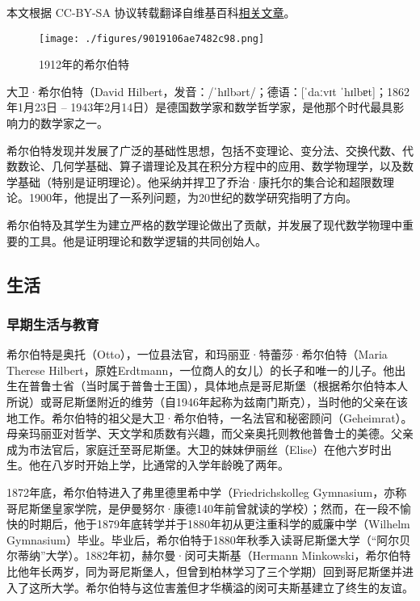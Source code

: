 
本文根据 CC-BY-SA 协议转载翻译自维基百科\href{https://en.wikipedia.org/wiki/David_Hilbert}{相关文章}。

\begin{figure}[ht]
\centering
\texttt{[image: ./figures/9019106ae7482c98.png]}
\caption{1912年的希尔伯特} \label{fig_David_1}
\end{figure}
大卫·希尔伯特（David Hilbert，发音：/ˈhɪlbərt/；德语：[ˈdaːvɪt ˈhɪlbɐt]；1862年1月23日 – 1943年2月14日）是德国数学家和数学哲学家，是他那个时代最具影响力的数学家之一。

希尔伯特发现并发展了广泛的基础性思想，包括不变理论、变分法、交换代数、代数数论、几何学基础、算子谱理论及其在积分方程中的应用、数学物理学，以及数学基础（特别是证明理论）。他采纳并捍卫了乔治·康托尔的集合论和超限数理论。1900年，他提出了一系列问题，为20世纪的数学研究指明了方向。

希尔伯特及其学生为建立严格的数学理论做出了贡献，并发展了现代数学物理中重要的工具。他是证明理论和数学逻辑的共同创始人。
\subsection{生活}  
\subsubsection{早期生活与教育}  
希尔伯特是奥托（Otto），一位县法官，和玛丽亚·特蕾莎·希尔伯特（Maria Therese Hilbert，原姓Erdtmann，一位商人的女儿）的长子和唯一的儿子。他出生在普鲁士省（当时属于普鲁士王国），具体地点是哥尼斯堡（根据希尔伯特本人所说）或哥尼斯堡附近的维劳（自1946年起称为兹南门斯克），当时他的父亲在该地工作。希尔伯特的祖父是大卫·希尔伯特，一名法官和秘密顾问（Geheimrat）。母亲玛丽亚对哲学、天文学和质数有兴趣，而父亲奥托则教他普鲁士的美德。父亲成为市法官后，家庭迁至哥尼斯堡。大卫的妹妹伊丽丝（Elise）在他六岁时出生。他在八岁时开始上学，比通常的入学年龄晚了两年。

1872年底，希尔伯特进入了弗里德里希中学（Friedrichskolleg Gymnasium，亦称哥尼斯堡皇家学院，是伊曼努尔·康德140年前曾就读的学校）；然而，在一段不愉快的时期后，他于1879年底转学并于1880年初从更注重科学的威廉中学（Wilhelm Gymnasium）毕业。毕业后，希尔伯特于1880年秋季入读哥尼斯堡大学（“阿尔贝尔蒂纳”大学）。1882年初，赫尔曼·闵可夫斯基（Hermann Minkowski，希尔伯特比他年长两岁，同为哥尼斯堡人，但曾到柏林学习了三个学期）回到哥尼斯堡并进入了这所大学。希尔伯特与这位害羞但才华横溢的闵可夫斯基建立了终生的友谊。
